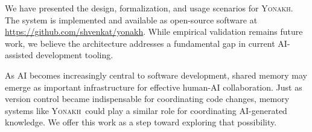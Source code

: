 \documentclass[10pt,journal,compsoc]{IEEEtran}
\newcommand{\yonakh}{\textsc{Yonakh}}
\begin{document}
We have presented the design, formalization, and usage scenarios for \yonakh. The system is implemented and available as open-source software at \url{https://github.com/shvenkat/yonakh}. While empirical validation remains future work, we believe the architecture addresses a fundamental gap in current AI-assisted development tooling.

As AI becomes increasingly central to software development, shared memory may emerge as important infrastructure for effective human-AI collaboration. Just as version control became indispensable for coordinating code changes, memory systems like \yonakh\ could play a similar role for coordinating AI-generated knowledge. We offer this work as a step toward exploring that possibility.



\end{document}

